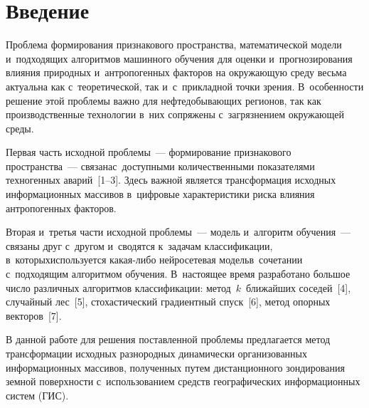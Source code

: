 
  
\vspace*{-3pt}



\thispagestyle{headings}

\begin{multicols}{2}

\label{st\stat}

  
\section{Введение}

\vspace*{-6pt}

  Проблема формирования признакового пространства, математической 
модели и~подходящих алгоритмов машинного обучения для оценки 
и~прогнозирования влияния природных и~антропогенных факторов на 
окружающую среду весьма актуальна как с~теоретической, так и~с~прикладной 
точки зрения. В~особенности решение этой проб\-ле\-мы важно для 
нефтедобывающих регионов, так как производственные технологии в~них 
сопряжены с~загрязнением окружающей среды. 
  
  Первая часть исходной проблемы~--- фор\-ми\-рование признакового 
пространства~--- связана\linebreak с~доступными количественными показателями 
техногенных аварий~[1--3]. Здесь важной является трансформация исходных 
информационных массивов в~цифровые характеристики риска влияния 
антропогенных факторов.
  
  Вторая и~третья части исходной проблемы~--- модель и~алгоритм  
обучения~--- связаны друг с~другом и~сводятся к~задачам классификации, 
в~которых\linebreak используется какая-либо нейросетевая модель\linebreak в~сочетании 
с~подходящим алгоритмом обучения. В~настоящее время разработано большое 
число различных алгоритмов классификации: метод~$k$~ближайших 
соседей~[4], случайный лес~[5], стохастический градиентный спуск~[6], метод 
опорных векторов~[7]. 
  
  В данной работе для решения поставленной проблемы предлагается метод 
трансформации исходных разнородных динамически организованных 
информационных массивов, полученных путем дис\-тан\-ци\-он\-но\-го зондирования 
земной поверхности с~использованием средств 
географических информационных сис\-тем (ГИС).
  

\end{multicols}
